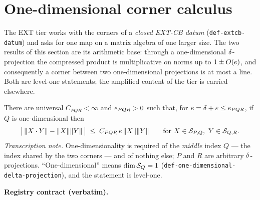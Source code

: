 \section{One-dimensional corner calculus}\label{sec:extcb-one-dimensional-corners}

The EXT tier works with the corners of a \emph{closed EXT-CB datum}
(\texttt{def-extcb-datum}) and asks for one map on a matrix algebra of one larger size.
The two results of this section are its arithmetic base: through a one-dimensional
$\delta$-projection the compressed product is multiplicative on norms up to $1\pm
O(e)$, and consequently a corner between two one-dimensional projections is at most a
line. Both are level-one statements; the amplified content of the tier is carried
elsewhere.

\begin{lemma}\label{lem:extcb-one-dimensional-product}
There are universal $C_{PQR}<\infty$ and $e_{PQR}>0$ such that, for
$e=\delta+\varepsilon\le e_{PQR}$, if $Q$ is one-dimensional then
\begin{equation}\label{eq:pqr-main}
  \bigl\lvert\,\lVert X\mathbin{\cdot} Y\rVert-\lVert X\rVert\lVert Y\rVert\,\bigr\rvert\;\le\;C_{PQR}\,e\,\lVert X\rVert\lVert Y\rVert
  \qquad\text{for }X\in\mathcal S_{P,Q},\ Y\in\mathcal S_{Q,R}.
\end{equation}
\emph{Transcription note.} One-dimensionality is required of the \emph{middle} index $Q$
--- the index shared by the two corners --- and of nothing else; $P$ and $R$ are arbitrary
$\delta$-projections. ``One-dimensional'' means $\dim\mathcal S_{Q}=1$
(\texttt{def-one-dimensional-delta-projection}), and the statement is level-one.
\end{lemma}

\noindent\textbf{Registry contract (verbatim).}


